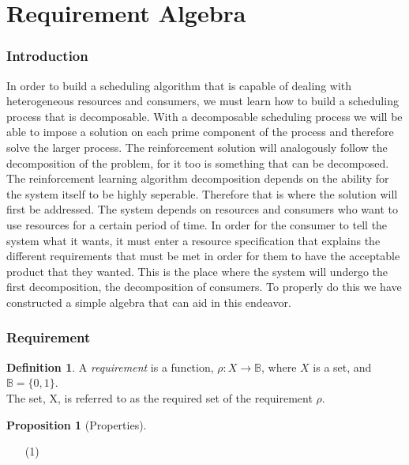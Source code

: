 \documentclass{article}
\theoremstyle{definition}
\newtheorem{definition}{Definition}[section]
\theoremstyle{remark}
\theoremstyle{theorem}
\theoremstyle{definition}
\newtheorem{proposition}{Proposition}[section]
\newcommand{\reqfunc}[2]{#1:#2\rightarrow\mathbb{B}}
\begin{document}
	
	
	\part{Requirement Algebra}
	
	\section{Introduction}
	
	In order to build a scheduling algorithm that is capable of dealing with heterogeneous resources and consumers,
    we must learn how to build a scheduling process that is decomposable. With a decomposable scheduling process we
    will be able to impose a solution on each prime component of the process and therefore solve the larger process.
    The reinforcement solution will analogously follow the decomposition of the problem, for it too is something that
    can be decomposed.  \\
	
	The reinforcement learning algorithm decomposition depends on the ability for the system itself to be highly
    seperable. Therefore that is where the solution will first be addressed. The system depends on resources and
    consumers who want to use resources for a certain period of time. In order for the consumer to tell the system
    what it wants, it must enter a resource specification that explains the different requirements that must be met
    in order for them to have the acceptable product that they wanted. This is the place where the system will undergo
    the first decomposition, the decomposition of consumers. To properly do this we have constructed a simple algebra
    that can aid in this endeavor. \\
	
	\section{Requirement}
	
		\begin{definition} 
			A \emph{requirement} is a function, $\reqfunc{\rho}{X}$, where $X$ is a set, and $\mathbb{B} = \{0,1\}$.\\
			
			The set, X, is referred to as the required set of the requirement $\rho$.
		\end{definition}
	
	    \begin{proposition}[Properties]
	    	
	    	\begin{enumerate}
	    		\item[(1)]
	    	\end{enumerate}
	    \end{proposition}
	
\end{document}
